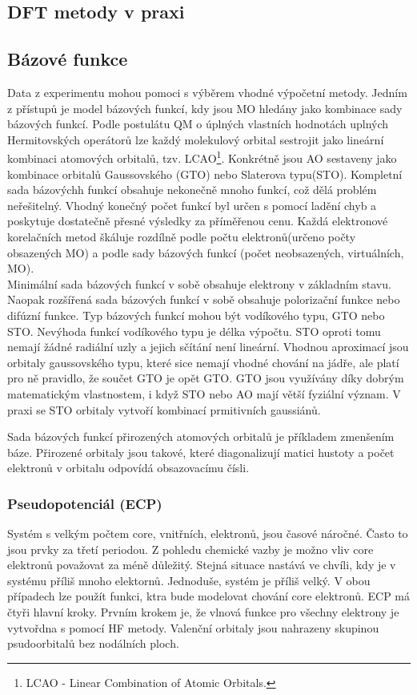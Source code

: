 \documentclass[
  digital, %
  table,   %
  lof,     %
  lot,     %
]{fithesis3}
\begin{document}
\subsection{DFT metody v praxi}

\subsection{Bázové funkce}
Data z experimentu mohou pomoci s výběrem vhodné výpočetní metody. Jedním z přístupů je model bázových funkcí, kdy jsou MO hledány jako kombinace sady bázových funkcí. Podle postulátu QM o úplných vlastních hodnotách uplných Hermitovských operátorů lze každý molekulový orbital sestrojit jako lineární kombinaci atomových orbitalů, tzv. LCAO\footnote{LCAO - Linear Combination of Atomic Orbitals.}. Konkrétně jsou AO sestaveny jako kombinace orbitalů Gaussovského (GTO) nebo Slaterova typu(STO).
Kompletní sada bázovýchh funkcí obsahuje nekonečně mnoho funkcí, což dělá problém neřešitelný. Vhodný konečný počet funkcí byl určen s pomocí ladění chyb a poskytuje dostatečně přesné výsledky za příměřenou cenu. Každá elektronové korelačních metod škáluje rozdílně podle počtu elektronů(určeno počty obsazených MO) a podle sady bázových funkcí (počet neobsazených, virtuálních, MO).\\
Minimální sada bázových funkcí v sobě obsahuje elektrony v základním stavu. Naopak rozšířená sada bázových funkcí v sobě obsahuje polorizační funkce nebo difúzní funkce. Typ bázových funkcí mohou být vodíkového typu, GTO nebo STO. Nevýhoda funkcí vodíkového typu je délka výpočtu. STO oproti tomu nemají žádné radiální uzly a jejich sčítání není lineární. Vhodnou aproximací jsou orbitaly gaussovského typu, které sice nemají vhodné chování na jádře, ale platí pro ně pravidlo, že součet GTO je opět GTO.\cite{lowe2011quantum} GTO jsou využívány díky dobrým matematickým vlastnostem, i když STO nebo AO mají větší fyziální význam. V praxi se STO orbitaly vytvoří kombinací prmitivních gaussiánů.

Sada bázových funkcí přirozených atomových orbitalů je příkladem zmenšením báze. Přirozené orbitaly jsou takové, které diagonalizují matici hustoty a počet elektronů v orbitalu odpovídá obsazovacímu čísli.

\subsubsection{Pseudopotenciál (ECP)}
Systém s velkým počtem core, vnitřních, elektronů, jsou časové náročné. Často to jsou prvky za třetí periodou. Z pohledu chemické vazby je možno vliv core elektronů považovat za méně důležitý. Stejná situace nastává ve chvíli, kdy je v systému příliš mnoho elektornů. Jednoduše, systém je příliš velký. V obou případech lze použít funkci, ktra bude modelovat chování core elektronů. ECP má čtyři hlavní kroky. Prvním krokem je, že vlnová funkce pro všechny elektrony je vytvořdna s pomocí HF metody. Valenční orbitaly jsou nahrazeny skupinou psudoorbitalů bez nodálních ploch.
\end{document}
